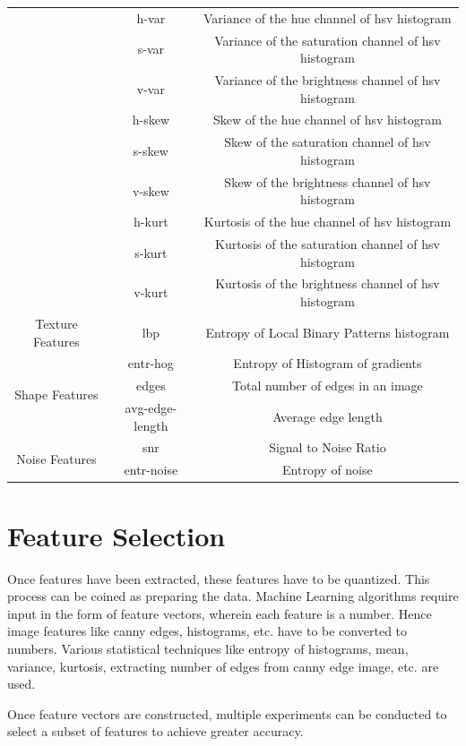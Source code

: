 \begin{table}[htb]
\begin{tabular}{ |c|c|c| }
		&	h-var & Variance of the hue channel of hsv histogram\\ 
		&	s-var & Variance  of the saturation channel of hsv histogram\\ 
		&   v-var & Variance of the brightness channel of hsv histogram \\ 

		&	h-skew & Skew of the hue channel of hsv histogram\\ 
		&	s-skew & Skew of the saturation channel of hsv histogram\\ 
		&   v-skew & Skew of the brightness channel of hsv histogram \\ 
	
		&	h-kurt & Kurtosis of the hue channel of hsv histogram\\ 
		&	s-kurt & Kurtosis of the saturation channel of hsv histogram\\ 
		&   v-kurt & Kurtosis of the brightness channel of hsv histogram \\ 
		\hline
		\multirow{1}{4em}{Texture Features} & lbp & Entropy of Local Binary Patterns histogram \\
		\hline
		\multirow{3}{4em}{Shape Features} & entr-hog & Entropy of Histogram of gradients\\
		&	edges & Total number of edges in an image\\ 
		&	avg-edge-length & Average edge length \\ 
		\hline
		\multirow{3}{4em}{Noise Features} & snr & Signal to Noise Ratio\\
		& entr-noise & Entropy of noise\\ 
		\hline
			
	\end{tabular}
	\label{table:feature_set}
\end{table}



\section{Feature Selection}

Once features have been extracted, these features have to be quantized. This process can be coined as preparing the data. Machine Learning algorithms require input in the form of feature vectors, wherein each feature is a number. Hence image features like canny edges, histograms, etc. have to be converted to numbers. Various statistical techniques like entropy of histograms, mean, variance, kurtosis, extracting number of edges from canny edge image, etc. are used. 

\par Once feature vectors are constructed, multiple experiments can be conducted to select a subset of features to achieve greater accuracy.
